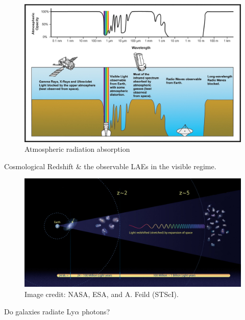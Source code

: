 \documentclass{beamer}
\begin{document}
\begin{frame}
\begin{figure}
\includegraphics[scale=0.8]{Figures/AtmosphericEM.jpg}
\caption{Atmospheric radiation absorption}
\end{figure}
\end{frame}



\begin{frame}{Cosmological Redshift \& the observable LAEs in the visible regime.}
\begin{figure}
\includegraphics[scale=0.3]{Figures/expansion.jpg}
\caption{Image credit: NASA, ESA, and A. Feild (STScI).}
\end{figure}
\end{frame}

\begin{frame}
\begin{center}
\LARGE{Do galaxies radiate Ly$\alpha$ photons?}
\end{center}
\end{frame}
\end{document}
